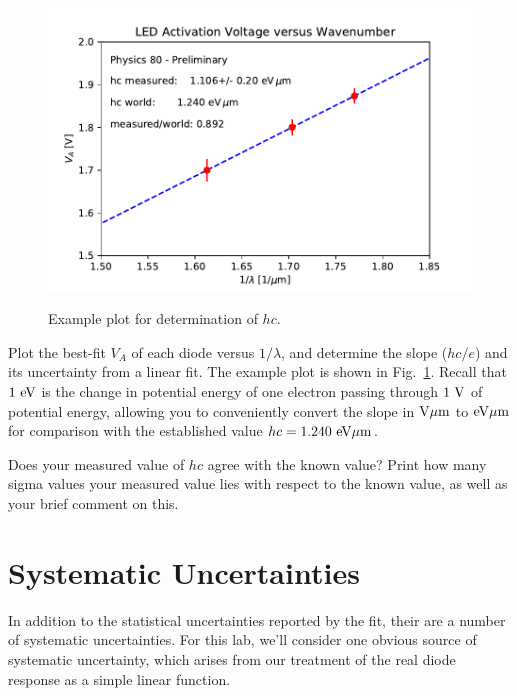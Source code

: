 \begin{figure}[htbp]
\begin{center}
\includegraphics[height=0.3\textheight]{figs/labs/planck/planck.pdf} \\
\end{center}
\caption{Example plot for determination of $hc$.}
\label{fig:planckfit}
\end{figure}

\begin{plot} 
Plot the best-fit $V_A$ of each diode versus $1/\lambda$, and
determine the slope ($hc/e$) and its uncertainty from a linear
fit.  The example plot is shown in Fig.~\ref{fig:planckfit}.
Recall that $1~\rm eV$ is the change in potential energy of one
electron passing through $1~\rm V$ of potential energy, allowing you
to conveniently convert the slope in $\rm V \mu m$ to $\rm eV \mu m$ for
comparison with the established value $hc = 1.240~\rm eV \mu m$.
\end{plot}
\begin{print}
Does your measured value of  $hc$ agree with the known value? Print how many  sigma values your  measured value lies with respect to the known value, as well as your brief comment on this.
\end{print}


\section{Systematic Uncertainties}

In addition to the statistical uncertainties reported by the fit,
their are a number of systematic uncertainties.  For this lab, we'll
consider one obvious source of systematic uncertainty, which arises
from our treatment of the real diode response as a simple linear
function.

